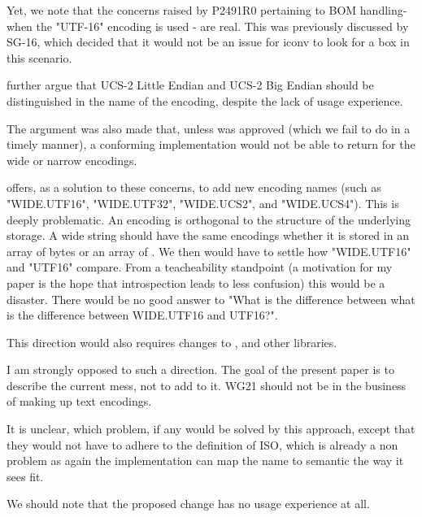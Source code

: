 \documentclass{wg21}
\begin{document}
Yet, we note that the concerns raised by P2491R0 pertaining to  BOM handling- when the "UTF-16" encoding is used - are real. This was previously discussed by SG-16, which decided that it would not be an issue for iconv to look for a box in this scenario.


 further argue that UCS-2 Little Endian and UCS-2 Big Endian should be distinguished in the name of the encoding,
despite the lack of usage experience.

The argument was also made that, unless  was approved (which we fail to do in a timely manner), a conforming implementation would not be able to return  for the wide or narrow encodings.


 offers, as a solution to these concerns, to add new encoding names (such as "WIDE.UTF16", "WIDE.UTF32", "WIDE.UCS2", and "WIDE.UCS4").
This is deeply problematic.
An encoding is orthogonal to the structure of the underlying storage. A wide string should have the same encodings whether it is stored in an array of bytes or an array of .
We then would have to settle how "WIDE.UTF16" and "UTF16" compare.
From a teacheability standpoint (a motivation for my paper is the hope that introspection leads to less confusion) this would be a disaster.
There would be no good answer to "What is the difference between what is the difference between WIDE.UTF16 and UTF16?".

This direction would also requires changes to ,  and other libraries.

I am strongly opposed to such a direction. The goal of the present paper is to describe the current mess, not to add to it.
WG21 should not be in the business of making up text encodings.

It is unclear, which problem, if any would be solved by this approach, except that they would not have to adhere to the definition of ISO, which is already a non problem as again the implementation can map the name to semantic the way it sees fit.

We should note that the proposed change has no usage experience at all.
\end{document}
